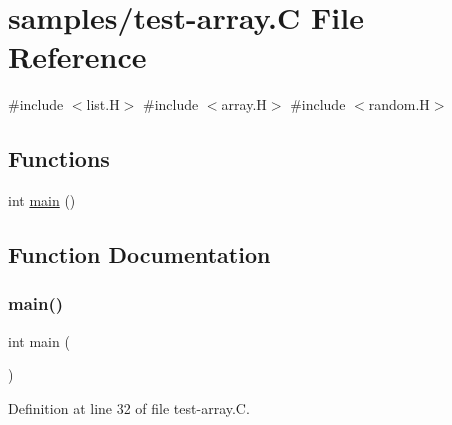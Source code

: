 \hypertarget{test-array_8_c}{}\section{samples/test-\/array.C File Reference}
\label{test-array_8_c}
{\ttfamily \#include $<$list.\+H$>$}\newline
{\ttfamily \#include $<$array.\+H$>$}\newline
{\ttfamily \#include $<$random.\+H$>$}\newline
\subsection*{Functions}
\begin{DoxyCompactItemize}
\item 
int \hyperlink{test-array_8_c_ae66f6b31b5ad750f1fe042a706a4e3d4}{main} ()
\end{DoxyCompactItemize}


\subsection{Function Documentation}
\mbox{\label{test-array_8_c_ae66f6b31b5ad750f1fe042a706a4e3d4}} 
\subsubsection{\texorpdfstring{main()}{main()}}
{\footnotesize\ttfamily int main (\begin{DoxyParamCaption}{ }\end{DoxyParamCaption})}



Definition at line 32 of file test-\/array.\+C.


